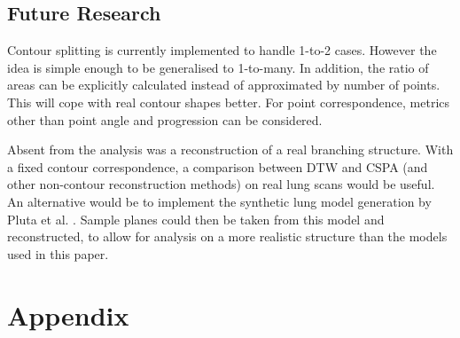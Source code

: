 \documentclass[11p, titlepage]{article}
\begin{document}
\subsection{Future Research}

Contour splitting is currently implemented to handle 1-to-2 cases. However the idea is simple enough to be generalised to 1-to-many. In addition, the ratio of areas can be explicitly calculated instead of approximated by number of points. This will cope with real contour shapes better. For point correspondence, metrics other than point angle and progression can be considered.

Absent from the analysis was a reconstruction of a real branching structure. With a fixed contour correspondence, a comparison between DTW and CSPA (and other non-contour reconstruction methods) on real lung scans would be useful. An alternative would be to implement the synthetic lung model generation by Pluta et al. \cite{pluta2012new}. Sample planes could then be taken from this model and reconstructed, to allow for analysis on a more realistic structure than the models used in this paper.

\pagebreak



\section{Appendix}
\end{document}
